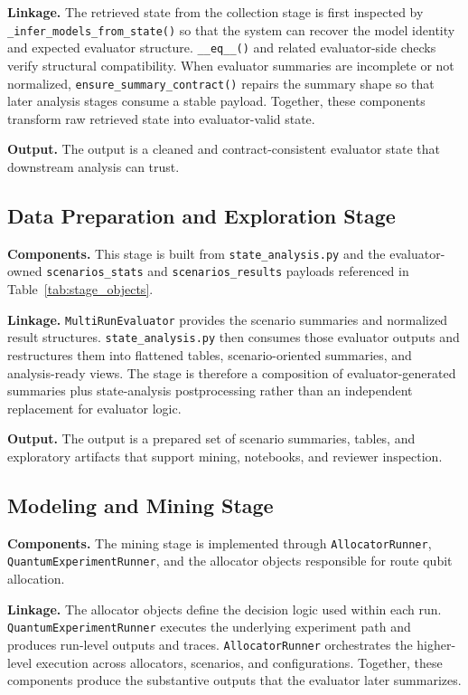 \documentclass{IEEEtran}
\begin{document}
\textbf{Linkage.} The retrieved state from the collection stage is first
inspected by \texttt{\_infer\_models\_from\_state()} so that the system can
recover the model identity and expected evaluator structure. \texttt{\_\_eq\_\_()}
and related evaluator-side checks verify structural compatibility. When
evaluator summaries are incomplete or not normalized,
\texttt{ensure\_summary\_contract()} repairs the summary shape so that later
analysis stages consume a stable payload. Together, these components transform
raw retrieved state into evaluator-valid state.

\textbf{Output.} The output is a cleaned and contract-consistent evaluator state
that downstream analysis can trust.

\subsection{Data Preparation and Exploration Stage}
\textbf{Components.} This stage is built from \texttt{state\_analysis.py} and
the evaluator-owned \texttt{scenarios\_stats} and
\texttt{scenarios\_results} payloads referenced in
Table~\ref{tab:stage_objects}.

\textbf{Linkage.} \texttt{MultiRunEvaluator} provides the scenario summaries
and normalized result structures. \texttt{state\_analysis.py} then consumes
those evaluator outputs and restructures them into flattened tables,
scenario-oriented summaries, and analysis-ready views. The stage is therefore a
composition of evaluator-generated summaries plus state-analysis postprocessing
rather than an independent replacement for evaluator logic.

\textbf{Output.} The output is a prepared set of scenario summaries, tables,
and exploratory artifacts that support mining, notebooks, and reviewer
inspection.

\subsection{Modeling and Mining Stage}
\textbf{Components.} The mining stage is implemented through
\texttt{AllocatorRunner}, \texttt{QuantumExperimentRunner}, and the allocator
objects responsible for route qubit allocation.

\textbf{Linkage.} The allocator objects define the decision logic used within
each run. \texttt{QuantumExperimentRunner} executes the underlying experiment
path and produces run-level outputs and traces. \texttt{AllocatorRunner}
orchestrates the higher-level execution across allocators, scenarios, and
configurations. Together, these components produce the substantive outputs that
the evaluator later summarizes.
\end{document}
